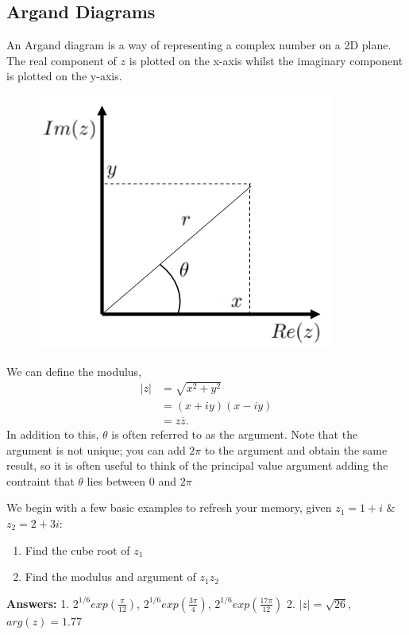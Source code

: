 \subsection{Argand Diagrams}
An Argand diagram is a way of representing a complex number on a 2D plane.
 The real component of $z$ is plotted on the x-axis whilst the imaginary component is plotted on the y-axis.
%
\begin{minipage}[t]{0.47\linewidth}
	\begin{figure}[H]
 		\centering
 		\includegraphics[width=\linewidth]{complex/argand}
 		\captionsetup{font=small} 	
	\end{figure} 
\end{minipage}
\hspace{0.6cm}
%
\begin{minipage}[t]{0.47\linewidth}
	\vspace{1cm}
	We can define the modulus, 
	\begin{align*}
		|z| &= \sqrt{x^2+y^2} \\
		&= (x+iy)(x-iy) \\
		&= z\overline{z}.
	\end{align*}
	In addition to this, $\theta$ is often referred to as the argument.
	 Note that the argument is not unique; you can add $2\pi$ to the argument and obtain the same result, so it is often useful to think of the principal value argument adding the contraint that $\theta$ lies between $0$ and $2\pi$
\end{minipage}
%
\begin{examples}
	We begin with a few basic examples to refresh your memory, given $z_1=1+i$ \& $z_2=2+3i$:
	\begin{enumerate}
		\item Find the cube root of $z_1$
		\item Find the modulus and argument of $z_1z_2$
	\end{enumerate}
\textbf{Answers:} 1. $2^{1/6}exp(\frac{\pi}{12})$, $2^{1/6}exp(\frac{3\pi}{4})$, $2^{1/6}exp(\frac{17\pi}{12})$ \hspace{0.5cm}
2. $|z| = \sqrt{26}$, $arg(z)=1.77$
\end{examples}
%
